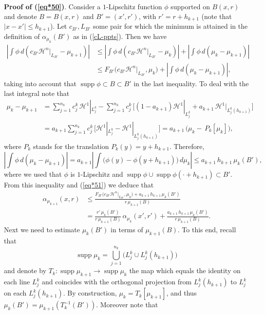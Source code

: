 \documentclass[11pt]{amsart}
\newcommand{\HH}{{\mathcal H}}
\newcommand{\rf}[1]{{(\ref{#1})}}
\newcommand{\supp}{\operatorname{supp}}
\newcommand{\vv}{{\vspace{2mm}}}
\theoremstyle{definition}
\theoremstyle{remark}
\numberwithin{equation}{section}
\begin{document}
\vv
{\bf Proof of \rf{eq*50}}.
Consider a $1$-Lipschitz function $\phi$ supported on $B(x,r)$ and
denote $B=B(x,r)$ and $B'=(x',r')$, with $r'=r+h_{k+1}$ (note that $|x-x'|\leq h_{k+1}$).
Let $c_{B'},L_{B'}$ some pair for which the minimum is attained in the definition of $\alpha_{\mu_k}(B')$ as in \rf{cL-ppts}.
Then we have
\begin{align}\label{eq*51}
\left|\int \phi\,d(c_{B'}\HH^n|_{L_{B'}} - \mu_{k+1})\right| & \leq
\left|\int \phi\,d(c_{B'}\HH^n|_{L_{B'}} - \mu_{k})\right| +
\left|\int \phi\,d(\mu_k - \mu_{k+1})\right|\\
&\leq F_{B'}\bigl(c_{B'}\HH^n|_{L_{B'}},\mu_{k}\bigr) + \left|\int \phi\,d(\mu_k - \mu_{k+1})\right|,
\nonumber
\end{align}
taking into account that $\supp\phi\subset B\subset B'$ in the last inequality.
To deal with the last integral note that
\begin{align*}
\mu_k - \mu_{k+1} & = \sum_{j=1}^{n_k} c_j^k \,\HH^1|_{L_j^k}  - \sum_{j=1}^{n_k} c_j^k \,\bigl[(1-a_{k+1}) \HH^1|_{L_j^k} + a_{k+1}\,\HH^1|_{L_j^k(h_{k+1})}\bigr]
\\
& = a_{k+1}
 \sum_{j=1}^{n_k} c_j^k \,\bigl[\HH^1|_{L_j^k} - \HH^1|_{L_j^k(h_{k+1})}\bigr]
 = a_{k+1} \,\bigl(\mu_k -  \,P_k[\mu_k]\bigr),
 \end{align*}
where $P_k$ stands for the translation $P_k(y) = y+h_{k+1}$.
Therefore,
$$\left|\int \phi\,d(\mu_k - \mu_{k+1})\right| = a_{k+1}
\left|\int \bigl(\phi(y)-\phi(y+h_{k+1})\bigr)\,d\mu_k\right| \leq a_{k+1}\,h_{k+1}\,\mu_k(B'),$$
where we used that $\phi$ is $1$-Lipschitz and $\supp\phi\cup\supp\phi(\cdot+h_{k+1})\subset B'$.
From this inequality and \rf{eq*51} we deduce that
\begin{align}\label{eqal99*}
\alpha_{\mu_{k+1}}(x,r)&\leq \frac{F_{B'}\bigl(c_{B'}\HH^n|_{L_{B'}},\mu_{k}\bigr) + a_{k+1}\,h_{k+1}\,\mu_k(B')}
{r\,\mu_{k+1}(B)}\\
& = \frac{r'\,\mu_k(B')}{r\,\mu_{k+1}(B)}\,
\alpha_{\mu_k}(x',r') + \frac{a_{k+1}\,h_{k+1}\,\mu_k(B')}
{r\,\mu_{k+1}(B)}.\nonumber
\end{align}
Next we need to estimate $\mu_k(B')$ in terms of $\mu_{k+1}(B)$. To this end, 
recall that
$$\supp\mu_k =\bigcup_{j=1}^{n_k} \bigl(L_j^k \cup L_j^k(h_{k+1})\bigr)$$
and denote by $T_k:\supp\mu_{k+1}
\to\supp\mu_k$ the map which equals the identity on each line $L_j^k$ and 
coincides with the orthogonal projection from $L_j^k(h_{k+1})$ to $L_j^k$ on each $L_j^k(h_{k+1})$.
By construction, $\mu_k=T_k[\mu_{k+1}]$, and thus  
$\mu_k(B') = \mu_{k+1}(T_k^{-1}(B'))$. Moreover note that
\end{document}
